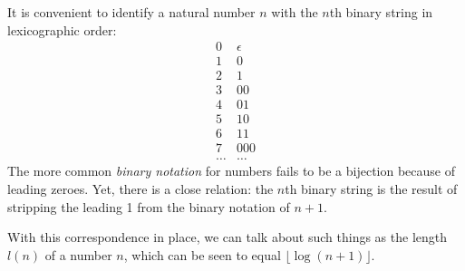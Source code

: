 \documentclass[12pt]{article}
\begin{document}
It is convenient to identify a natural number $n$ with the $n$th binary
string in lexicographic order:
$$
\begin{array}{ll}
0 & \epsilon \\
1 & 0 \\
2 & 1 \\
3 & 00 \\
4 & 01 \\
5 & 10 \\
6 & 11 \\
7 & 000 \\
\ldots & \ldots
\end{array}
$$
The more common {\em binary notation} for numbers fails to be a bijection
because of leading zeroes. Yet, there is a close relation: the $n$th
binary string is the result of stripping the leading 1 from the binary
notation of $n+1$.


With this correspondence in place, we can talk about such things as
the length $l(n)$ of a number $n$, which can be seen to equal
$\lfloor \log (n+1) \rfloor$.
\end{document}
